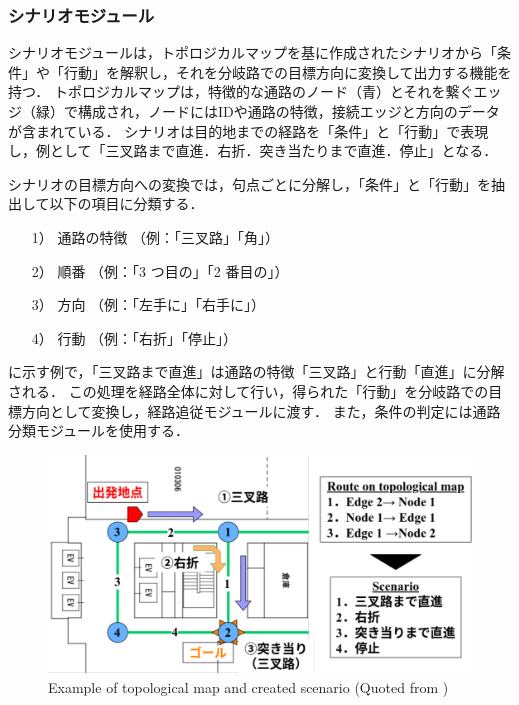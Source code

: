 \subsubsection{シナリオモジュール}
シナリオモジュールは，トポロジカルマップを基に作成されたシナリオから「条件」や「行動」を解釈し，それを分岐路での目標方向に変換して出力する機能を持つ．
トポロジカルマップは，特徴的な通路のノード（青）とそれを繋ぐエッジ（緑）で構成され，ノードにはIDや通路の特徴，接続エッジと方向のデータが含まれている．
シナリオは目的地までの経路を「条件」と「行動」で表現し，例として「三叉路まで直進．右折．突き当たりまで直進．停止」となる．

シナリオの目標方向への変換では，句点ごとに分解し，「条件」と「行動」を抽出して以下の項目に分類する．
\begin{enumerate}
  \item [1）] 通路の特徴 （例：「三叉路」「角」）
  \item [2）] 順番 （例：「3 つ目の」「2 番目の」） 
  \item [3）] 方向 （例：「左手に」「右手に」）
  \item [4）] 行動 （例：「右折」「停止」）
\end{enumerate}

に示す例で，「三叉路まで直進」は通路の特徴「三叉路」と行動「直進」に分解される．
この処理を経路全体に対して行い，得られた「行動」を分岐路での目標方向として変換し，経路追従モジュールに渡す．
また，条件の判定には通路分類モジュールを使用する．

\begin{figure}[htbp]
  \centering
   \includegraphics[width=130mm]{images/pdf/haruyama/scenario.pdf}
   \caption{ Example of topological map and created scenario (Quoted from \cite{haruyama2023})}
   \label{fig:scenario}
\end{figure}

\clearpage
